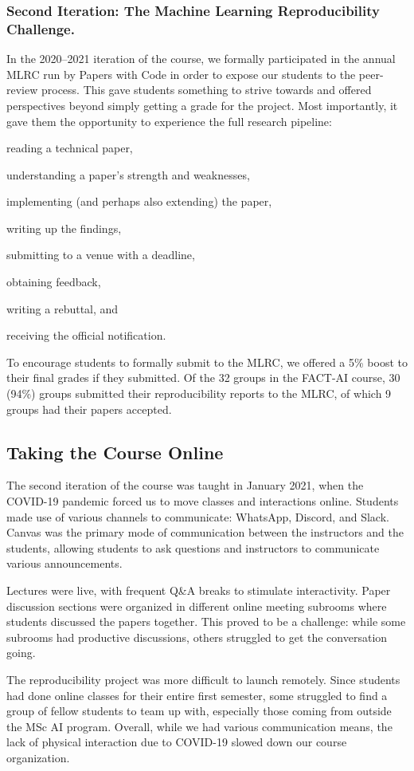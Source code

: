 \subsubsection{Second Iteration: The Machine Learning Reproducibility Challenge.}
In the 2020--2021 iteration of the course, we formally participated in the annual MLRC run by Papers with Code \citep{paperswithcode2020} in order to expose our students to the peer-review process. 
This gave students something to strive towards and offered perspectives beyond simply getting a grade for the project. 
Most importantly, it gave them the opportunity to experience the full research pipeline: 
\begin{enumerate*}[label=(\roman*)]
	\item reading a technical paper, 
	\item understanding a paper's strength and weaknesses, 
	\item implementing (and perhaps also extending) the paper, 
	\item writing up the findings, 
	\item submitting to a venue with a deadline, 
	\item obtaining feedback, 
	\item writing a rebuttal, and
	\item receiving the official notification. 
\end{enumerate*}
To encourage students to formally submit to the MLRC, we offered a 5\% boost to their final grades if they submitted. 
Of the 32 groups in the FACT-AI course, 30 (94\%) groups submitted their reproducibility reports to the MLRC, of which 9 groups had their papers accepted.

\subsection{Taking the Course Online}
The second iteration of the course was taught in January 2021, when the COVID-19 pandemic forced us to move classes and interactions online. 
Students made use of various channels to communicate: WhatsApp, Discord, and Slack.  
Canvas was the primary mode of communication between the instructors and the students, allowing students to ask questions and instructors to communicate various announcements. 

Lectures were live, with frequent Q\&A breaks to stimulate interactivity. 
Paper discussion sections were organized in different online meeting subrooms where students discussed the papers together.  
This proved to be a challenge: while some subrooms had productive discussions, others struggled to get the conversation going. 

The reproducibility project was more difficult to launch remotely. 
Since students had done online classes for their entire first semester, some struggled to find a group of fellow students to team up with, especially those coming from outside the MSc AI program. 
Overall, while we had various communication means, the lack of physical interaction due to COVID-19 slowed down our course organization. 
